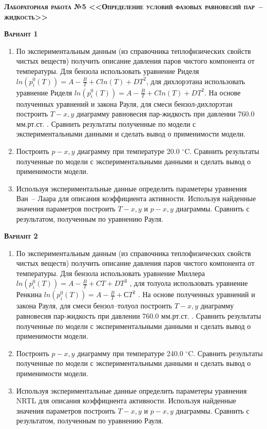 \textsc{\textbf{Лабораторная работа №5 <<Определение условий фазовых равновесий пар~-- жидкость>>}}

\textsc{\textbf{Вариант 1}}
\begin{enumerate}
\item По экспериментальным данным (из справочника теплофизических свойств чистых веществ) получить описание давления паров чистого компонента от температуры. Для бензола использовать уравнение Риделя $ln(p_i^0(T))=A-\frac{B}{T}+C ln(T)+DT^2$, для дихлорэтана использовать уравнение Риделя $ln(p_i^0(T))=A-\frac{B}{T}+C ln(T)+DT^2$. На основе полученных уравнений и закона Рауля, для смеси бензол-дихлорэтан построить $T-x,y$ диаграмму равновесия пар-жидкость при давлении  760.0 мм.рт.ст. . Сравнить результаты полученные по модели с экспериментальными данными и сделать вывод о применимости модели.

\item Построить $p-x,y$ диаграмму при температуре   20.0 $^\circ$C. Сравнить результаты полученные по модели с экспериментальными данными и сделать вывод о применимости модели. \item Используя экспериментальные данные определить параметеры уравнения Ван~-- Лаара для описания коэффициента активности. Используя найденные значения параметров построить $T-x,y$ и $p-x,y$ диаграммы. Сравнить с результатом, полученным по уравнению Рауля.\end{enumerate}

\textsc{\textbf{Вариант 2}}
\begin{enumerate}
\item По экспериментальным данным (из справочника теплофизических свойств чистых веществ) получить описание давления паров чистого компонента от температуры. Для бензола использовать уравнение Миллера $ln(p_i^0(T))=A-\frac{B}{T}+C T+DT^3$  , для толуола использовать уравнение Ренкина $ln(p_i^0(T))=A-\frac{B}{T}+СT^2$     . На основе полученных уравнений и закона Рауля, для смеси бензол--толуол построить $T-x,y$ диаграмму равновесия пар-жидкость при давлении  760.0 мм.рт.ст. . Сравнить результаты полученные по модели с экспериментальными данными и сделать вывод о применимости модели.

\item Построить $p-x,y$ диаграмму при температуре  240.0 $^\circ$C. Сравнить результаты полученные по модели с экспериментальными данными и сделать вывод о применимости модели. \item Используя экспериментальные данные определить параметеры уравнения NRTL                 для описания коэффициента активности. Используя найденные значения параметров построить $T-x,y$ и $p-x,y$ диаграммы. Сравнить с результатом, полученным по уравнению Рауля.\end{enumerate}

